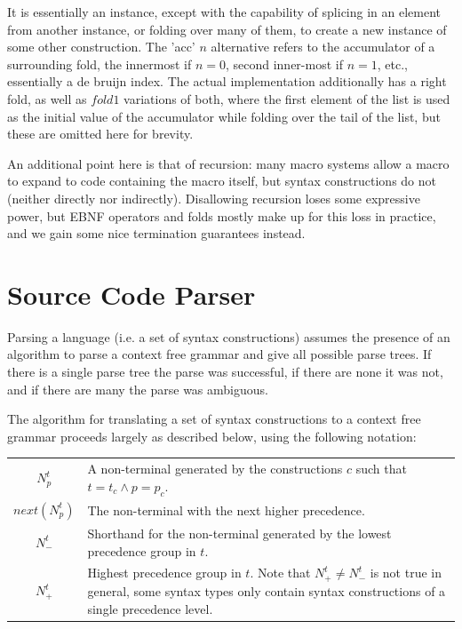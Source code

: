 \documentclass{kththesis}
\begin{document}
It is essentially an instance, except with the capability of splicing in an element from another instance, or folding over many of them, to create a new instance of some other construction. The 'acc' $n$ alternative refers to the accumulator of a surrounding fold, the innermost if $n = 0$, second inner-most if $n = 1$, etc., essentially a de bruijn index. The actual implementation additionally has a right fold, as well as $fold1$ variations of both, where the first element of the list is used as the initial value of the accumulator while folding over the tail of the list, but these are omitted here for brevity.

An additional point here is that of recursion: many macro systems allow a macro to expand to code containing the macro itself, but syntax constructions do not (neither directly nor indirectly). Disallowing recursion loses some expressive power, but EBNF operators and folds mostly make up for this loss in practice, and we gain some nice termination guarantees instead.

\section{Source Code Parser}

Parsing a language (i.e. a set of syntax constructions) assumes the presence of an algorithm to parse a context free grammar and give all possible parse trees. If there is a single parse tree the parse was successful, if there are none it was not, and if there are many the parse was ambiguous.

The algorithm for translating a set of syntax constructions to a context free grammar proceeds largely as described below, using the following notation:

\mathligsoff
{\tabulinesep=2mm
\begin{tabu}{c|p{10cm}}
$N^t_p$ & A non-terminal generated by the constructions $c$ such that $t = t_c \land p = p_c$. \\
$next(N^t_p)$ & The non-terminal with the next higher precedence. \\
$N^t_-$ & Shorthand for the non-terminal generated by the lowest precedence group in $t$. \\
$N^t_+$ & Highest precedence group in $t$. Note that $N^t_+ \neq N^t_-$ is not true in general, some syntax types only contain syntax constructions of a single precedence level. \\
\end{tabu}
}
\end{document}
